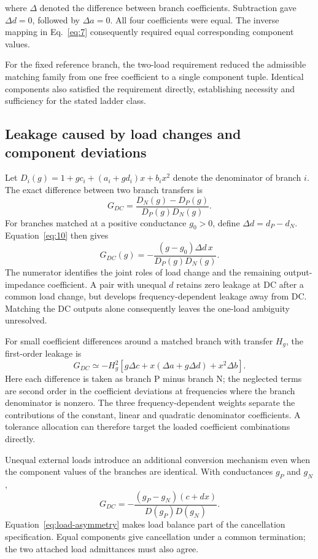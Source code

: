where \(\Delta\) denoted the difference between branch coefficients. Subtraction gave \(\Delta d=0\), followed by \(\Delta a=0\). All four coefficients were equal. The inverse mapping in Eq.~\eqref{eq:7} consequently required equal corresponding component values.

For the fixed reference branch, the two-load requirement reduced the admissible matching family from one free coefficient to a single component tuple. Identical components also satisfied the requirement directly, establishing necessity and sufficiency for the stated ladder class.


\subsection{Leakage caused by load changes and component deviations}

Let $D_i(g)=1+gc_i+(a_i+gd_i)x+b_ix^2$ denote the denominator of branch $i$. The exact difference between two branch transfers is
\begin{equation}\label{eq:load-leakage}
G_{DC}=\frac{D_N(g)-D_P(g)}{D_P(g)D_N(g)}.
\end{equation}
For branches matched at a positive conductance $g_0>0$, define $\Delta d=d_P-d_N$. Equation~\eqref{eq:10} then gives
\begin{equation}\label{eq:load-shift}
G_{DC}(g)=-\frac{(g-g_0)\Delta d\,x}{D_P(g)D_N(g)}.
\end{equation}
The numerator identifies the joint roles of load change and the remaining output-impedance coefficient. A pair with unequal $d$ retains zero leakage at DC after a common load change, but develops frequency-dependent leakage away from DC. Matching the DC outputs alone consequently leaves the one-load ambiguity unresolved.

For small coefficient differences around a matched branch with transfer $H_g$, the first-order leakage is
\begin{equation}\label{eq:sensitivity}
G_{DC}\simeq-H_g^2\left[g\Delta c+x(\Delta a+g\Delta d)+x^2\Delta b\right].
\end{equation}
Here each difference is taken as branch P minus branch N; the neglected terms are second order in the coefficient deviations at frequencies where the branch denominator is nonzero. The three frequency-dependent weights separate the contributions of the constant, linear and quadratic denominator coefficients. A tolerance allocation can therefore target the loaded coefficient combinations directly.

Unequal external loads introduce an additional conversion mechanism even when the component values of the branches are identical. With conductances $g_P$ and $g_N$,
\begin{equation}\label{eq:load-asymmetry}
G_{DC}=-\frac{(g_P-g_N)(c+dx)}{D(g_P)D(g_N)}.
\end{equation}
Equation~\eqref{eq:load-asymmetry} makes load balance part of the cancellation specification. Equal components give cancellation under a common termination; the two attached load admittances must also agree.

\FloatBarrier
